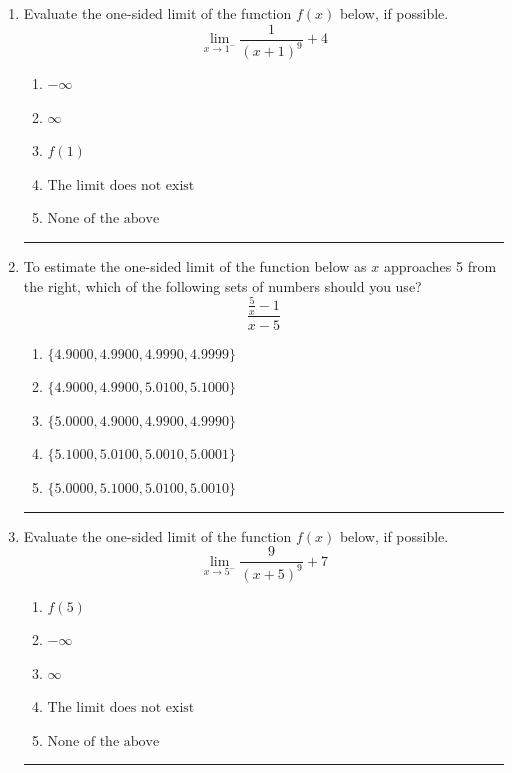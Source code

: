 \documentclass[14pt]{extbook}
\newcommand{\litem}[1]{\item#1\hspace*{-1cm}\rule{\textwidth}{0.4pt}}
\begin{document}
\begin{enumerate}
\litem{
Evaluate the one-sided limit of the function $f(x)$ below, if possible.\[ \lim_{x \rightarrow 1^-} \frac{1}{(x+1)^9}+4 \]\begin{enumerate}[label=\Alph*.]
\item \( -\infty \)
\item \( \infty \)
\item \( f(1) \)
\item \( \text{The limit does not exist} \)
\item \( \text{None of the above} \)

\end{enumerate} }
\litem{
To estimate the one-sided limit of the function below as $x$ approaches 5 from the right, which of the following sets of numbers should you use?\[ \frac{\frac{5}{x} - 1}{x - 5} \]\begin{enumerate}[label=\Alph*.]
\item \( \{ 4.9000, 4.9900, 4.9990, 4.9999 \} \)
\item \( \{ 4.9000, 4.9900, 5.0100, 5.1000 \} \)
\item \( \{ 5.0000, 4.9000, 4.9900, 4.9990 \} \)
\item \( \{ 5.1000, 5.0100, 5.0010, 5.0001 \} \)
\item \( \{ 5.0000, 5.1000, 5.0100, 5.0010 \} \)

\end{enumerate} }
\litem{
Evaluate the one-sided limit of the function $f(x)$ below, if possible.\[ \lim_{x \rightarrow 5^-} \frac{9}{(x+5)^9}+7 \]\begin{enumerate}[label=\Alph*.]
\item \( f(5) \)
\item \( -\infty \)
\item \( \infty \)
\item \( \text{The limit does not exist} \)
\item \( \text{None of the above} \)


\end{enumerate}}
\end{enumerate}
\end{document}
